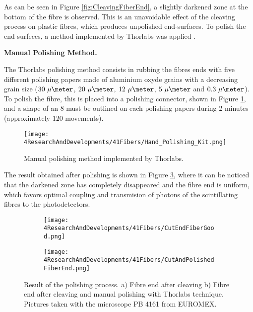 As can be seen in Figure \ref{fig:CleavingFiberEnd}, a slightly darkened zone at the bottom of the fibre is observed. This is an unavoidable effect of the cleaving process on plastic fibres, which produces unpolished end-surfaces. To polish the end-surfeces, a method implemented by Thorlabs was applied \cite{DiamondThorlabs}. 

\textbf{Manual Polishing Method.}

The Thorlabs polishing method consists in rubbing the fibres ends with five different polishing papers made of aluminium oxyde grains with a decreasing grain size ($30~\mu\meter$, $20~\mu\meter$, $12~\mu\meter$, $5~\mu\meter$ and $0.3~\mu\meter$). To polish the fibre, this is placed into a polishing connector, shown in Figure \ref{fig:HandPolishingMethod}, and a shape of an 8 must be outlined on each polishing papers during 2 minutes (approximately 120 movements). 

\begin{figure}[h]
\centering
\texttt{[image: 4ResearchAndDevelopments/41Fibers/Hand\_Polishing\_Kit.png]}
\caption{Manual polishing method implemented by Thorlabs.\label{fig:HandPolishingMethod}}
\end{figure}
The result obtained after polishing is shown in Figure \ref{subfig:PolishFiberEnd}, where it can be noticed that the darkened zone has completely disappeared and the fibre end is uniform, which favors optimal coupling and transmision of photons of the scintillating fibres to the photodetectors.

\begin{figure}
\centering
    \begin{subfigure}[b]{0.5\textwidth}
    \centering
    \texttt{[image: 4ResearchAndDevelopments/41Fibers/CutEndFiberGood.png]}  
    \caption{\label{subfig:CleaveFiberEnd}}
    \end{subfigure}
    \hfill
    \begin{subfigure}[b]{0.45\textwidth}
    \centering
    \texttt{[image: 4ResearchAndDevelopments/41Fibers/CutAndPolishedFiberEnd.png]}  
    \caption{\label{subfig:PolishFiberEnd}}
    \end{subfigure}
 \caption{Result of the polishing process. a) Fibre end after cleaving b) Fibre end after cleaving and manual polishing with Thorlabs technique. Pictures taken with the microscope PB 4161 from EUROMEX.}
 \label{fig:ResultofPolishingProcess}
\end{figure}

